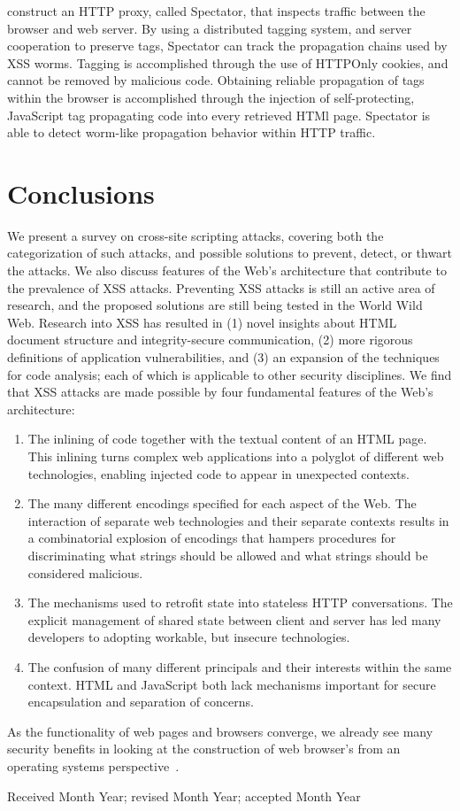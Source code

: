 \documentclass{acmtrans2m}
\begin{document}
 construct an HTTP proxy, called Spectator, that inspects traffic between the browser and web server.
By using a distributed tagging system, and server cooperation to preserve tags, Spectator can track the propagation chains used by XSS worms.
Tagging is accomplished through the use of HTTPOnly cookies, and cannot be removed by malicious code.
Obtaining reliable propagation of tags within the browser is accomplished through the injection of self-protecting, JavaScript tag propagating code into every retrieved HTMl page.
Spectator is able to detect worm-like propagation behavior within HTTP traffic.


\section{Conclusions}

We present a survey on cross-site scripting attacks, covering both the categorization of such attacks, and possible solutions to prevent, detect, or thwart the attacks.
We also discuss features of the Web's architecture that contribute to the prevalence of XSS attacks.
Preventing XSS attacks is still an active area of research, and the proposed solutions are still being tested in the World Wild Web.
Research into XSS has resulted in (1) novel insights about HTML document structure and integrity-secure communication, (2) more rigorous definitions of application vulnerabilities, and (3) an expansion of the techniques for code analysis; each of which is applicable to other security disciplines.
We find that XSS attacks are made possible by four fundamental features of the Web's architecture:
\begin{enumerate}
 \item The inlining of code together with the textual content of an HTML page.
This inlining turns complex web applications into a polyglot of different web technologies, enabling injected code to appear in unexpected contexts.
 \item The many different encodings specified for each aspect of the Web.
The interaction of separate web technologies and their separate contexts results in a combinatorial explosion of encodings that hampers procedures for discriminating what strings should be allowed and what strings should be considered malicious.
 \item The mechanisms used to retrofit state into stateless HTTP conversations.
The explicit management of shared state between client and server has led many developers to adopting workable, but insecure technologies.
 \item The confusion of many different principals and their interests within the same context.
HTML and JavaScript both lack mechanisms important for secure encapsulation and separation of concerns.
\end{enumerate}
As the functionality of web pages and browsers converge, we already see many security benefits in looking at the construction of web browser's from an operating systems perspective~\cite{browserOS}.




\begin{received}
Received Month Year; revised Month Year; accepted Month Year
\end{received}
\end{document}
